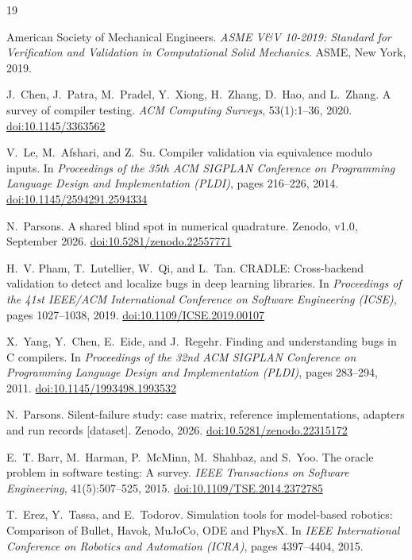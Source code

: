 \documentclass[review,12pt]{elsarticle}
\newcommand{\doi}[1]{\href{https://doi.org/#1}{doi:#1}}
\begin{document}
\begin{thebibliography}{19}

American Society of Mechanical Engineers.
\newblock \emph{ASME V\&V 10-2019: Standard for Verification and Validation in
  Computational Solid Mechanics}.
\newblock ASME, New York, 2019.

J.~Chen, J.~Patra, M.~Pradel, Y.~Xiong, H.~Zhang, D.~Hao, and L.~Zhang.
\newblock A survey of compiler testing.
\newblock \emph{ACM Computing Surveys}, 53(1):1--36, 2020.
  \newblock \doi{10.1145/3363562}

V.~Le, M.~Afshari, and Z.~Su.
\newblock Compiler validation via equivalence modulo inputs.
\newblock In \emph{Proceedings of the 35th ACM SIGPLAN Conference on
  Programming Language Design and Implementation (PLDI)}, pages 216--226,
  2014. \newblock \doi{10.1145/2594291.2594334}

N.~Parsons.
\newblock A shared blind spot in numerical quadrature.
\newblock Zenodo, v1.0, September 2026.
  \newblock \doi{10.5281/zenodo.22557771}

H.~V. Pham, T.~Lutellier, W.~Qi, and L.~Tan.
\newblock CRADLE: Cross-backend validation to detect and localize bugs in
  deep learning libraries.
\newblock In \emph{Proceedings of the 41st IEEE/ACM International
  Conference on Software Engineering (ICSE)}, pages 1027--1038, 2019.
  \newblock \doi{10.1109/ICSE.2019.00107}

X.~Yang, Y.~Chen, E.~Eide, and J.~Regehr.
\newblock Finding and understanding bugs in C compilers.
\newblock In \emph{Proceedings of the 32nd ACM SIGPLAN Conference on
  Programming Language Design and Implementation (PLDI)}, pages 283--294,
  2011. \newblock \doi{10.1145/1993498.1993532}

N.~Parsons.
\newblock Silent-failure study: case matrix, reference implementations,
  adapters and run records [dataset].
\newblock Zenodo, 2026.
  \newblock \doi{10.5281/zenodo.22315172}

E.~T. Barr, M.~Harman, P.~McMinn, M.~Shahbaz, and S.~Yoo.
\newblock The oracle problem in software testing: A survey.
\newblock \emph{IEEE Transactions on Software Engineering}, 41(5):507--525,
  2015. \newblock \doi{10.1109/TSE.2014.2372785}

T.~Erez, Y.~Tassa, and E.~Todorov.
\newblock Simulation tools for model-based robotics: Comparison of Bullet,
  Havok, MuJoCo, ODE and PhysX.
\newblock In \emph{IEEE International Conference on Robotics and Automation
  (ICRA)}, pages 4397--4404, 2015.


\end{thebibliography}
\end{document}
